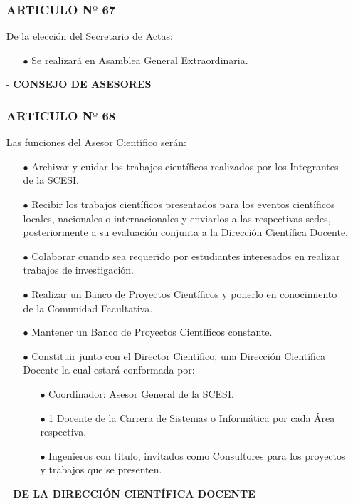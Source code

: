\documentclass[11pt,letterpaper]{book}
\begin{document}
\begin{itemize}
\subsubsection*{ARTICULO N$º$ 67}
De la elección del Secretario de Actas:
\begin{itemize}
\item[$\bullet$] Se realizará en Asamblea General  Extraordinaria.
\end{itemize}
\item[-] {\bf CONSEJO DE ASESORES}
\subsubsection*{ARTICULO N$º$ 68}
Las funciones del Asesor Científico serán:
\begin{itemize}
\item[$\bullet$] Archivar y cuidar los trabajos científicos realizados por los Integrantes de la SCESI. 
\item[$\bullet$] Recibir los trabajos científicos presentados para los eventos científicos locales, nacionales o internacionales y enviarlos a las respectivas sedes, posteriormente a su evaluación conjunta a la Dirección Científica Docente. 
\item[$\bullet$] Colaborar cuando sea requerido por estudiantes interesados en realizar trabajos de investigación. 
\item[$\bullet$] Realizar un Banco de Proyectos Científicos y ponerlo en conocimiento de la Comunidad Facultativa. 
\item[$\bullet$] Mantener un Banco de Proyectos Científicos constante. 
\item[$\bullet$] Constituir junto con el Director Científico, una Dirección Científica Docente la cual estará conformada por: 
\begin{itemize}
\item[$\bullet$] Coordinador: Asesor General de la SCESI. 
\item[$\bullet$] 1 Docente de la Carrera de Sistemas o Informática por cada Área respectiva. 
\item[$\bullet$] Ingenieros con título, invitados como Consultores para los proyectos y trabajos que se presenten.  
\end{itemize}
\end{itemize}
\item[-] {\bf DE LA DIRECCIÓN CIENTÍFICA DOCENTE}

\end{itemize}
\end{document}
